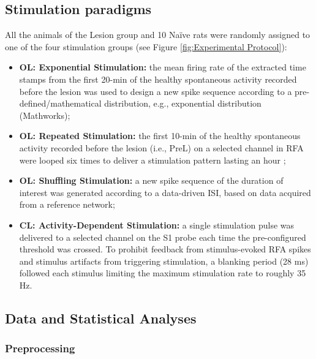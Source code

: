 \subsection{Stimulation paradigms}

All the animals of the Lesion group and 10 Naïve rats were randomly assigned to one of the four stimulation groups (see Figure \ref{fig:Experimental Protocol}):
\begin{itemize}
    \item \textbf{OL: Exponential Stimulation:} the mean firing rate of the extracted time stamps from the first 20-min of the healthy spontaneous activity recorded before the lesion was used to design a new spike sequence according to a pre-defined/mathematical distribution, e.g., exponential distribution (Mathworks); 
    \item \textbf{OL: Repeated Stimulation:} the first 10-min of the healthy spontaneous activity recorded before the lesion (i.e., PreL) on a selected channel in RFA were looped six times to deliver a stimulation pattern lasting an hour \cite{Zullo2012};
    \item \textbf{OL: Shuffling Stimulation:} a new spike sequence of the duration of interest was generated according to a data-driven ISI, based on data acquired from a reference network;
    \item \textbf{CL: Activity-Dependent Stimulation:} a single stimulation pulse was delivered to a selected channel on the S1 probe each time the pre-configured threshold was crossed. To prohibit feedback from stimulus-evoked RFA spikes and stimulus artifacts from triggering stimulation, a blanking period (28 ms) followed each stimulus limiting the maximum stimulation rate to roughly 35 Hz.
\end{itemize}

\subsection{Data and Statistical Analyses}

\subsubsection{Preprocessing}

